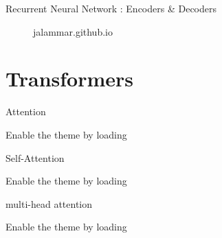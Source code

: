 \documentclass[10pt]{beamer}
\begin{document}
\begin{frame}[fragile]{Recurrent Neural Network : Encoders \& Decoders}

	\begin{figure}[h]
		\centering
	\end{figure}

	\begin{figure}[h]
		\centering
		\caption{jalammar.github.io}
	\end{figure}

\end{frame}

\section[Transformers]{Transformers}

\begin{frame}[fragile]{Attention}

	Enable the theme by loading

\end{frame}

\begin{frame}[fragile]{Self-Attention}

	Enable the theme by loading

\end{frame}

\begin{frame}[fragile]{multi-head attention}

	Enable the theme by loading

\end{frame}
\end{document}
